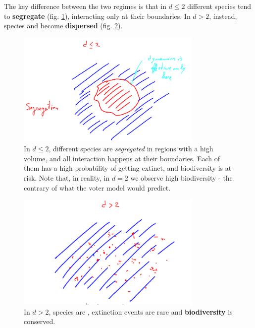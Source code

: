 \documentclass[../../main.tex]{subfiles}
\begin{document}
\medskip

The key difference between the two regimes is that in $d \leq 2$ different species tend to \textbf{segregate} (fig. \ref{fig:segregation}), interacting only at their boundaries. In $d > 2$, instead, species  and become \textbf{dispersed} (fig. \ref{fig:dispersion}).     

\begin{figure}[H]
    \centering
    \includegraphics[width=0.8\textwidth]{segregation.png}
    \caption{In $d \leq 2$, different species are \textit{segregated} in regions with a high volume, and all interaction happens at their boundaries. Each of them has a high probability of getting extinct, and biodiversity is at risk. Note that, in reality, in $d=2$ we observe high biodiversity - the contrary of what the voter model would predict.}
    \label{fig:segregation}
\end{figure}

\begin{figure}[H]
    \centering
    \includegraphics[width=0.8\textwidth]{dispersion.png}
    \caption{In $d>2$, species are , extinction events are rare and \textbf{biodiversity} is conserved.}
    \label{fig:dispersion}
\end{figure}
\end{document}
